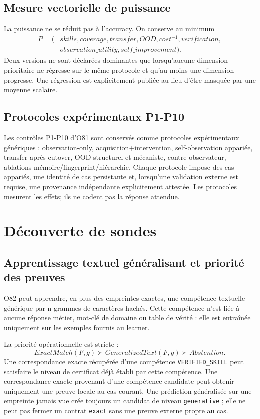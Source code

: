 \documentclass[11pt,a4paper]{report}
\begin{document}
\section{Mesure vectorielle de puissance}
La puissance ne se réduit pas à l'accuracy. On conserve au minimum
\[
\begin{aligned}
P=(&skills,coverage,transfer,OOD,cost^{-1},verification,\\
&observation\_utility,self\_improvement).
\end{aligned}
\]
Deux versions ne sont déclarées dominantes que lorsqu'aucune dimension prioritaire ne régresse sur le même protocole et qu'au moins une dimension progresse. Une régression est explicitement publiée au lieu d'être masquée par une moyenne scalaire.

\section{Protocoles expérimentaux P1-P10}
Les contrôles P1-P10 d'O81 sont conservés comme protocoles expérimentaux génériques : observation-only, acquisition+intervention, self-observation appariée, transfer après cutover, OOD structurel et mécaniste, contre-observateur, ablations mémoire/fingerprint/hiérarchie. Chaque protocole impose des cas appariés, une identité de cas persistante et, lorsqu'une validation externe est requise, une provenance indépendante explicitement attestée. Les protocoles mesurent les effets; ils ne codent pas la réponse attendue.

\chapter{Découverte de sondes}
\section{Apprentissage textuel généralisant et priorité des preuves}
O82 peut apprendre, en plus des empreintes exactes, une compétence textuelle générique par n-grammes de caractères hachés. Cette compétence n'est liée à aucune réponse métier, mot-clé de domaine ou table de vérité : elle est entraînée uniquement sur les exemples fournis au learner.

La priorité opérationnelle est stricte :
\[
ExactMatch(F,g) \succ GeneralizedText(F,g) \succ Abstention.
\]
Une correspondance exacte récupérée d'une compétence \texttt{VERIFIED\_SKILL} peut satisfaire le niveau de certificat déjà établi par cette compétence. Une correspondance exacte provenant d'une compétence candidate peut obtenir uniquement une preuve locale au cas courant. Une prédiction généralisée sur une empreinte jamais vue crée toujours un candidat de niveau \texttt{generative} ; elle ne peut pas fermer un contrat \texttt{exact} sans une preuve externe propre au cas.
\end{document}
